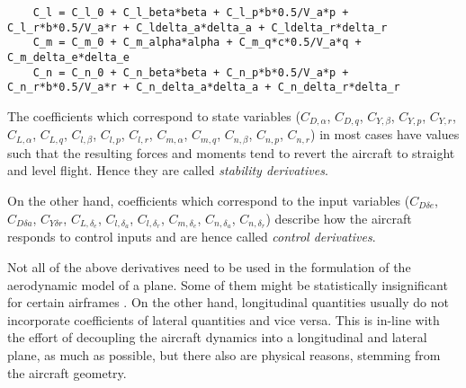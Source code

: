 %
\begin{lstlisting}
	C_l = C_l_0 + C_l_beta*beta + C_l_p*b*0.5/V_a*p + C_l_r*b*0.5/V_a*r + C_ldelta_a*delta_a + C_ldelta_r*delta_r 
	C_m = C_m_0 + C_m_alpha*alpha + C_m_q*c*0.5/V_a*q + C_m_delta_e*delta_e 
	C_n = C_n_0 + C_n_beta*beta + C_n_p*b*0.5/V_a*p + C_n_r*b*0.5/V_a*r + C_n_delta_a*delta_a + C_n_delta_r*delta_r 
\end{lstlisting}
%
The coefficients which correspond to state variables ($C_{D,\alpha}$, $C_{D,q}$, $C_{Y,\beta}$, $C_{Y,p}$, $C_{Y,r}$, $C_{L,\alpha}$, $C_{L,q}$, $C_{l,\beta}$,
$C_{l,p}$, $C_{l,r}$, $C_{m,\alpha}$, $C_{m,q}$, $C_{n,\beta}$, $C_{n,p}$, $C_{n,r}$) in most cases have values such that the resulting forces and moments tend to revert the aircraft to straight and level flight. Hence they are called \emph{stability derivatives}.

On the other hand, coefficients which correspond to the input variables ($C_{D\delta e}$, $C_{D\delta a}$, $ C_{Y\delta r}$,
 $C_{L,\delta_e}$, $C_{l,\delta_a}$, $C_{l,\delta_r}$, $C_{m,\delta_e}$, $C_{n,\delta_a}$, $C_{n,\delta_r}$) describe how the aircraft responds to control inputs and are hence called \emph{control derivatives}.


Not all of the above derivatives need to be used in the formulation of the aerodynamic model of a plane. Some of them might be statistically insignificant for certain airframes \cite{Klein2006}. On the other hand, longitudinal quantities usually do not incorporate coefficients of lateral quantities and vice versa. This is in-line with the effort of decoupling the aircraft dynamics into a longitudinal and lateral plane, as much as possible, but there also are physical reasons, stemming from the aircraft geometry.